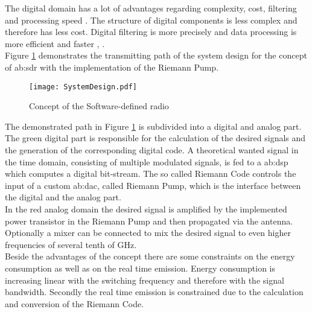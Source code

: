 The digital domain has a lot of advantages regarding complexity, cost, filtering and processing speed \cite{Grossman2005}.
The structure of digital components is less complex and therefore has less cost.
Digital filtering is more precisely and data processing is more efficient and faster \cite{Chamberlain2015}, \cite{LiRaghunathanJha2009}.\\
Figure \ref{fig:System} demonstrates the transmitting path of the system design for the concept of \gls{ab:sdr} with the implementation of the Riemann Pump.

\begin{figure}[ht]
	\centering
  \texttt{[image: SystemDesign.pdf]}
	\caption{Concept of the Software-defined radio}
	\label{fig:System}
\end{figure}

The demonstrated path in Figure \ref{fig:System} is subdivided into a digital and analog part.
The green digital part is responsible for the calculation of the desired signals and the generation of the corresponding digital code.
A theoretical wanted signal in the time domain, consisting of multiple modulated signals, is fed to a \gls{ab:dsp} which computes a digital bit-stream.
The so called Riemann Code controls the input of a custom \gls{ab:dac}, called Riemann Pump, which is the interface between the digital and the analog part.\\
In the red analog domain the desired signal is amplified by the implemented power transistor in the Riemann Pump and then propagated via the antenna.
Optionally a mixer can be connected to mix the desired signal to even higher frequencies of several tenth of \si{\giga \hertz}.\\
Beside the advantages of the concept there are some constraints on the energy consumption as well as on the real time emission.
Energy consumption is increasing linear with the switching frequency and therefore with the signal bandwidth.
Secondly the real time emission is constrained due to the calculation and conversion of the Riemann Code.

